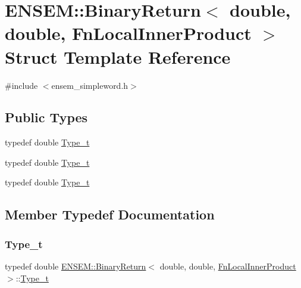 \hypertarget{structENSEM_1_1BinaryReturn_3_01double_00_01double_00_01FnLocalInnerProduct_01_4}{}\section{E\+N\+S\+EM\+:\+:Binary\+Return$<$ double, double, Fn\+Local\+Inner\+Product $>$ Struct Template Reference}
\label{structENSEM_1_1BinaryReturn_3_01double_00_01double_00_01FnLocalInnerProduct_01_4}


{\ttfamily \#include $<$ensem\+\_\+simpleword.\+h$>$}

\subsection*{Public Types}
\begin{DoxyCompactItemize}
\item 
typedef double \mbox{\hyperlink{structENSEM_1_1BinaryReturn_3_01double_00_01double_00_01FnLocalInnerProduct_01_4_a086cf9ffa1dbc1fba4c959bf0ae38e60}{Type\+\_\+t}}
\item 
typedef double \mbox{\hyperlink{structENSEM_1_1BinaryReturn_3_01double_00_01double_00_01FnLocalInnerProduct_01_4_a086cf9ffa1dbc1fba4c959bf0ae38e60}{Type\+\_\+t}}
\item 
typedef double \mbox{\hyperlink{structENSEM_1_1BinaryReturn_3_01double_00_01double_00_01FnLocalInnerProduct_01_4_a086cf9ffa1dbc1fba4c959bf0ae38e60}{Type\+\_\+t}}
\end{DoxyCompactItemize}


\subsection{Member Typedef Documentation}
\mbox{\label{structENSEM_1_1BinaryReturn_3_01double_00_01double_00_01FnLocalInnerProduct_01_4_a086cf9ffa1dbc1fba4c959bf0ae38e60}} 
\subsubsection{\texorpdfstring{Type\_t}{Type\_t}\hspace{0.1cm}{\footnotesize\ttfamily [1/3]}}
{\footnotesize\ttfamily typedef double \mbox{\hyperlink{structENSEM_1_1BinaryReturn}{E\+N\+S\+E\+M\+::\+Binary\+Return}}$<$ double, double, \mbox{\hyperlink{structENSEM_1_1FnLocalInnerProduct}{Fn\+Local\+Inner\+Product}} $>$\+::\mbox{\hyperlink{structENSEM_1_1BinaryReturn_3_01double_00_01double_00_01FnLocalInnerProduct_01_4_a086cf9ffa1dbc1fba4c959bf0ae38e60}{Type\+\_\+t}}}

